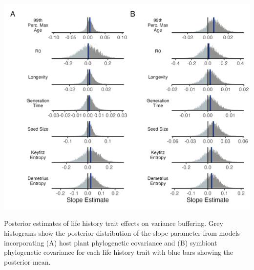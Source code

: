 \documentclass[lineno, sn-basic]{sn-jnl}%
\providecommand{\DIFaddbegin}{} %
\providecommand{\DIFaddend}{} %
\providecommand{\DIFdelbegin}{} %
\providecommand{\DIFdelend}{} %
\providecommand{\DIFaddbeginFL}{} %
\providecommand{\DIFaddendFL}{} %
\providecommand{\DIFdelbeginFL}{} %
\providecommand{\DIFdelendFL}{} %
\newcommand{\DIFscaledelfig}{0.5}
\newlength{\DIFdelgraphicswidth} %
\newlength{\DIFdelgraphicsheight} %
\newcommand{\DIFaddincludegraphics}[2][]{{\color{blue}\fbox{\DIFOincludegraphics[#1]{#2}}}} %
\newcommand{\DIFdelincludegraphics}[2][]{%
\sbox{\DIFdelgraphicsbox}{\DIFOincludegraphics[#1]{#2}}%
\settoboxwidth{\DIFdelgraphicswidth}{\DIFdelgraphicsbox} %
\settoboxtotalheight{\DIFdelgraphicsheight}{\DIFdelgraphicsbox} %
\scalebox{\DIFscaledelfig}{%
\parbox[b]{\DIFdelgraphicswidth}{\usebox{\DIFdelgraphicsbox}\\[-\baselineskip] \rule{\DIFdelgraphicswidth}{0em}}\llap{\resizebox{\DIFdelgraphicswidth}{\DIFdelgraphicsheight}{%
\setlength{\unitlength}{\DIFdelgraphicswidth}%
\begin{picture}(1,1)%
\thicklines\linethickness{2pt} %
{\color[rgb]{1,0,0}\put(0,0){\framebox(1,1){}}}%
{\color[rgb]{1,0,0}\put(0,0){\line( 1,1){1}}}%
{\color[rgb]{1,0,0}\put(0,1){\line(1,-1){1}}}%
\end{picture}%
}\hspace*{3pt}}} %
} %
\DeclareRobustCommand{\DIFaddbegin}{\DIFOaddbegin \let\includegraphics\DIFaddincludegraphics} %
\DeclareRobustCommand{\DIFaddend}{\DIFOaddend \let\includegraphics\DIFOincludegraphics} %
\DeclareRobustCommand{\DIFdelbegin}{\DIFOdelbegin \let\includegraphics\DIFdelincludegraphics} %
\DeclareRobustCommand{\DIFdelend}{\DIFOaddend \let\includegraphics\DIFOincludegraphics} %
\DeclareRobustCommand{\DIFaddbeginFL}{\DIFOaddbeginFL \let\includegraphics\DIFaddincludegraphics} %
\DeclareRobustCommand{\DIFaddendFL}{\DIFOaddendFL \let\includegraphics\DIFOincludegraphics} %
\DeclareRobustCommand{\DIFdelbeginFL}{\DIFOdelbeginFL \let\includegraphics\DIFdelincludegraphics} %
\DeclareRobustCommand{\DIFdelendFL}{\DIFOaddendFL \let\includegraphics\DIFOincludegraphics} %
\begin{document}
\DIFdelbegin %
\DIFdelendFL \DIFaddbeginFL \begin{myfigure}[H]
	\DIFaddendFL \centering
	\includegraphics[width=\linewidth]{lh_slopes_plot.png}
	\DIFdelbeginFL %
\DIFdelendFL \DIFaddbeginFL \caption[Posterior estimates of life history trait effects on variance buffering]{\DIFaddendFL Posterior estimates of life history trait effects on variance buffering. Grey histograms show the posterior distribution of the slope parameter from models incorporating (A) host plant phylogenetic covariance and (B) symbiont phylogenetic covariance for each life history trait with blue bars showing the posterior mean.}
\DIFdelbeginFL %
\DIFdelend \DIFaddbegin \end{myfigure}
\DIFaddend 
\end{document}
